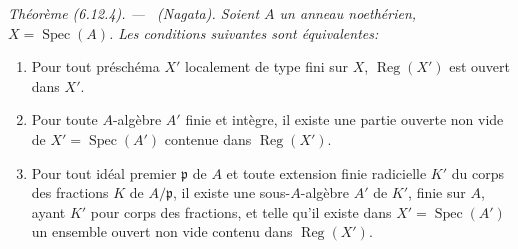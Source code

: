 \documentclass[10pt,oneside]{book}
\newenvironment{theorem}[1][]{%
  \par\medskip\noindent\itshape Théorème (#1). ---\ }{\par}
\begin{document}
\begin{theorem}[6.12.4]
\label{IV.2.s6.12.4-fr}
(Nagata). Soient $A$ un anneau noethérien,
$X=\operatorname{Spec}(A)$. Les conditions suivantes sont équivalentes:
\begin{enumerate}
\item[a)] Pour tout préschéma $X'$ localement de type fini sur $X$,
$\operatorname{Reg}(X')$ est ouvert dans $X'$.
\item[b)] Pour toute $A$-algèbre $A'$ finie et intègre, il existe une
partie ouverte non vide de $X'=\operatorname{Spec}(A')$ contenue dans
$\operatorname{Reg}(X')$.
\item[c)] Pour tout idéal premier $\mathfrak p$ de $A$ et toute extension
finie radicielle $K'$ du corps des fractions $K$ de $A/\mathfrak p$, il
existe une sous-$A$-algèbre $A'$ de $K'$, finie sur $A$, ayant $K'$ pour
corps des fractions, et telle qu'il existe dans
$X'=\operatorname{Spec}(A')$ un ensemble ouvert non vide contenu dans
$\operatorname{Reg}(X')$.
\end{enumerate}
\end{theorem}
\end{document}
